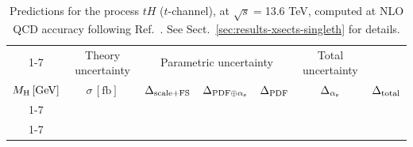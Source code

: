 \begin{table}[ht!]
\caption{\label{tab:th-t-top136} Predictions for the process $tH$ ($t$-channel), at $\sqrt{s}=$13.6 TeV, computed at NLO QCD accuracy following Ref.~\cite{Demartin:2015uha}. See Sect.~\ref{sec:results-xsects-singleth} for details.}
\centering
\scriptsize
{\renewcommand{\arraystretch}{1.4}
\begin{tabular}{| cc | c | ccc | c |}
\cline{1-7}
\multicolumn{2}{|c|}{\(\sqrt{s} = 13.6\,\mathrm{TeV}\)} &
\multicolumn{1}{|c|}{Theory uncertainty} &
\multicolumn{3}{|c|}{Parametric uncertainty} &
\multicolumn{1}{c|}{Total uncertainty} \\
\(M_\mathrm{H}\,[\mathrm{GeV}]\) & \(\sigma\,[\mathrm{fb}]\) &
\(\Delta_{\rm scale+\textrm{FS}}\) &
\(\Delta_{{\rm PDF}\oplus\alpha_{\mathrm{s}}}\) &
{\color{black!55}\(\Delta_{\rm PDF}\)} & {\color{black!55}\(\Delta_{\alpha_{\mathrm{s}}}\)} &
\(\Delta_{\rm total}\)
\\
\cline{1-7}
 \\
\cline{1-7}
\end{tabular}
}
\end{table}

